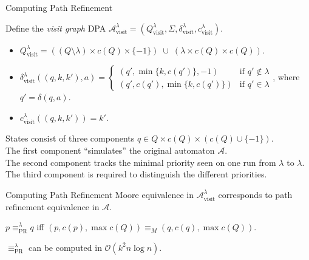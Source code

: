 \begin{frame}{Computing Path Refinement}
	\begin{defn}
		Define the \emph{visit graph} DPA $\mathcal{A}_\text{visit}^\lambda = (Q_\text{visit}^\lambda, \Sigma, \delta_\text{visit}^\lambda, c_\text{visit}^\lambda)$.
		\begin{itemize}
			\item $Q_\text{visit}^\lambda = ((Q \setminus \lambda) \times c(Q) \times \{-1\}) \;\cup\; (\lambda \times c(Q) \times c(Q))$.
			\item $\delta^\lambda_\text{visit}((q, k, k'), a) = \begin{cases}
				(q', \min \{k, c(q')\}, -1) & \text{if } q' \notin \lambda \\
				(q', c(q'), \min \{k, c(q')\}) & \text{if } q' \in \lambda
			\end{cases}$, where $q' = \delta(q, a)$.
			\item $c_\text{visit}^\lambda((q, k, k')) = k'$.
		\end{itemize}
	\end{defn}
	
	States consist of three components $q \in Q \times c(Q) \times (c(Q) \cup \{-1\})$. \\
	The first component \enquote{simulates} the original automaton $\mathcal{A}$. \\
	The second component tracks the minimal priority seen on one run from $\lambda$ to $\lambda$. \\
	The third component is required to distinguish the different priorities.
\end{frame}


\begin{frame}{Computing Path Refinement}
	Moore equivalence in $\mathcal{A}_\text{visit}^\lambda$ corresponds to path refinement equivalence in $\mathcal{A}$.
	
	\begin{theorem}
		$p \equiv_\text{PR}^\lambda q$ iff $(p, c(p), \max c(Q)) \equiv_M (q, c(q), \max c(Q))$.
	\end{theorem}
	
	\begin{theorem}
		$\equiv_\text{PR}^\lambda$ can be computed in $\mathcal{O}(k^2 n \log n)$.
	\end{theorem}
\end{frame}


